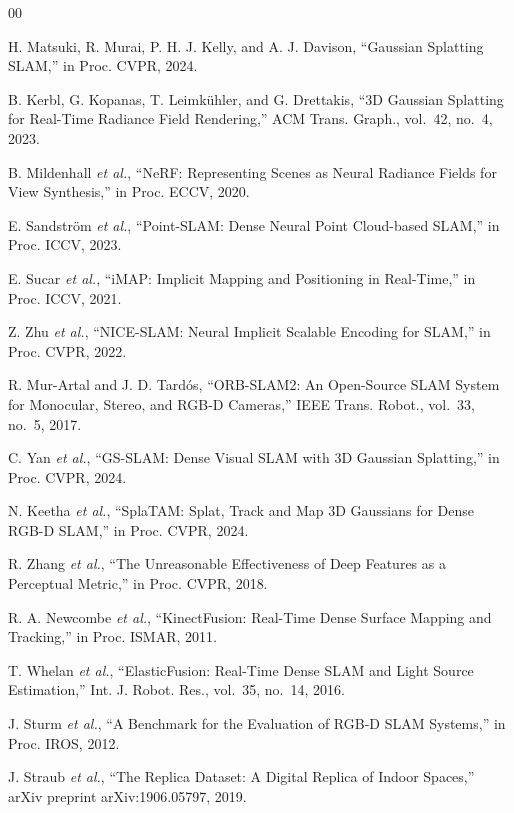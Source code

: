 \documentclass[conference]{IEEEtran}
\begin{document}
\begin{thebibliography}{00}

 H. Matsuki, R. Murai, P. H. J. Kelly, and A. J. Davison, ``Gaussian Splatting SLAM,'' in Proc. CVPR, 2024.

 B. Kerbl, G. Kopanas, T. Leimk\"{u}hler, and G. Drettakis, ``3D Gaussian Splatting for Real-Time Radiance Field Rendering,'' ACM Trans. Graph., vol.~42, no.~4, 2023.

 B. Mildenhall \textit{et al.}, ``NeRF: Representing Scenes as Neural Radiance Fields for View Synthesis,'' in Proc. ECCV, 2020.

 E. Sandstr\"{o}m \textit{et al.}, ``Point-SLAM: Dense Neural Point Cloud-based SLAM,'' in Proc. ICCV, 2023.

 E. Sucar \textit{et al.}, ``iMAP: Implicit Mapping and Positioning in Real-Time,'' in Proc. ICCV, 2021.

 Z. Zhu \textit{et al.}, ``NICE-SLAM: Neural Implicit Scalable Encoding for SLAM,'' in Proc. CVPR, 2022.

 R. Mur-Artal and J. D. Tard\'{o}s, ``ORB-SLAM2: An Open-Source SLAM System for Monocular, Stereo, and RGB-D Cameras,'' IEEE Trans. Robot., vol.~33, no.~5, 2017.

 C. Yan \textit{et al.}, ``GS-SLAM: Dense Visual SLAM with 3D Gaussian Splatting,'' in Proc. CVPR, 2024.

 N. Keetha \textit{et al.}, ``SplaTAM: Splat, Track and Map 3D Gaussians for Dense RGB-D SLAM,'' in Proc. CVPR, 2024.

 R. Zhang \textit{et al.}, ``The Unreasonable Effectiveness of Deep Features as a Perceptual Metric,'' in Proc. CVPR, 2018.

 R. A. Newcombe \textit{et al.}, ``KinectFusion: Real-Time Dense Surface Mapping and Tracking,'' in Proc. ISMAR, 2011.

 T. Whelan \textit{et al.}, ``ElasticFusion: Real-Time Dense SLAM and Light Source Estimation,'' Int. J. Robot. Res., vol.~35, no.~14, 2016.

 J. Sturm \textit{et al.}, ``A Benchmark for the Evaluation of RGB-D SLAM Systems,'' in Proc. IROS, 2012.

 J. Straub \textit{et al.}, ``The Replica Dataset: A Digital Replica of Indoor Spaces,'' arXiv preprint arXiv:1906.05797, 2019.


\end{thebibliography}
\end{document}
